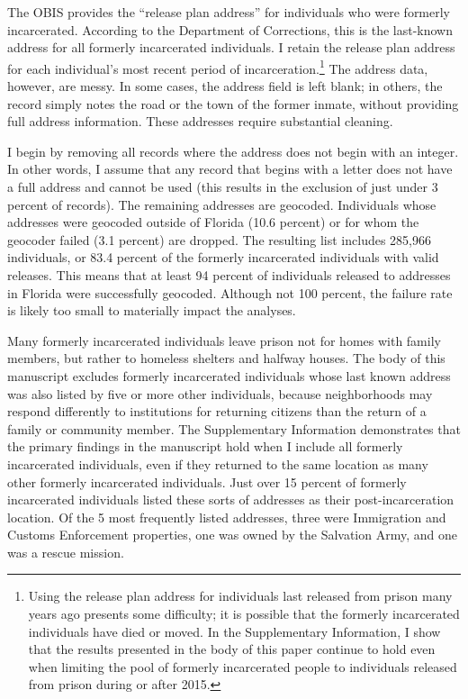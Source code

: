 \documentclass[
  12pt,
]{article}
\begin{document}
The OBIS provides the ``release plan address'' for individuals who were formerly incarcerated. According to the Department of Corrections, this is the last-known address for all formerly incarcerated individuals. I retain the release plan address for each individual's most recent period of incarceration.\footnote{Using the release plan address for individuals last released from prison many years ago presents some difficulty; it is possible that the formerly incarcerated individuals have died or moved. In the Supplementary Information, I show that the results presented in the body of this paper continue to hold even when limiting the pool of formerly incarcerated people to individuals released from prison during or after 2015.} The address data, however, are messy. In some cases, the address field is left blank; in others, the record simply notes the road or the town of the former inmate, without providing full address information. These addresses require substantial cleaning.

I begin by removing all records where the address does not begin with an integer. In other words, I assume that any record that begins with a letter does not have a full address and cannot be used (this results in the exclusion of just under 3 percent of records). The remaining addresses are geocoded. Individuals whose addresses were geocoded outside of Florida (10.6 percent) or for whom the geocoder failed (3.1 percent) are dropped. The resulting list includes 285,966 individuals, or 83.4 percent of the formerly incarcerated individuals with valid releases. This means that at least 94 percent of individuals released to addresses in Florida were successfully geocoded. Although not 100 percent, the failure rate is likely too small to materially impact the analyses.

Many formerly incarcerated individuals leave prison not for homes with family members, but rather to homeless shelters and halfway houses. The body of this manuscript excludes formerly incarcerated individuals whose last known address was also listed by five or more other individuals, because neighborhoods may respond differently to institutions for returning citizens than the return of a family or community member. The Supplementary Information demonstrates that the primary findings in the manuscript hold when I include all formerly incarcerated individuals, even if they returned to the same location as many other formerly incarcerated individuals. Just over 15 percent of formerly incarcerated individuals listed these sorts of addresses as their post-incarceration location. Of the 5 most frequently listed addresses, three were Immigration and Customs Enforcement properties, one was owned by the Salvation Army, and one was a rescue mission.
\end{document}

